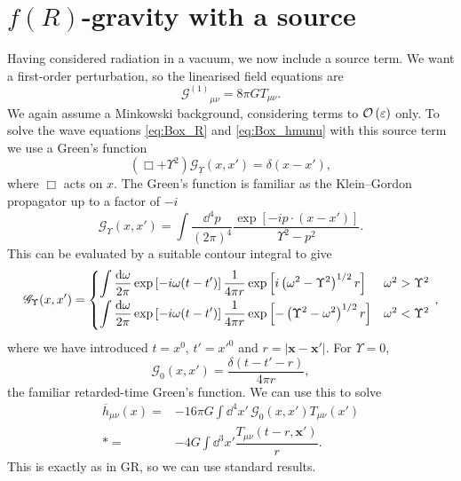 \section{$f(R)$-gravity with a source}\label{sec:Source}

Having considered radiation in a vacuum, we now include a source term. We want a first-order perturbation, so the linearised field equations are
\begin{equation}
{\mathcal{G}^{(1)}}_{\mu\nu} = 8\pi G T_{\mu\nu}.
\end{equation}
We again assume a Minkowski background, considering terms to $\mathcal{O}\left({\varepsilon}\right)$ only. To solve the wave equations \eqref{eq:Box_R} and \eqref{eq:Box_hmunu} with this source term we use a Green's function
\begin{equation}
\left(\Box + \Upsilon^2\right)\mathscr{G}_\Upsilon(x, x') = \delta(x - x'),
\end{equation}
where $\Box$ acts on $x$. The Green's function is familiar as the Klein--Gordon propagator up to a factor of $-i$ \citep[section 2.4]{Peskin1995a}
\begin{equation}
\mathscr{G}_\Upsilon(x, x') = \int \dfrac{\dd^4 p}{(2\pi)^4} \dfrac{\exp\left[-ip\cdot(x-x')\right]}{\Upsilon^2 - p^2}.
\end{equation}
This can be evaluated by a suitable contour integral to give
\begin{equation}
\mathscr{G}_\Upsilon(x, x') =
\begin{cases}
{\displaystyle \int{\dfrac{\dd \omega}{2\pi} \exp\left[-i\omega(t-t')\right]\recip{4\pi r}\exp\left[i\left(\omega^2 - \Upsilon^2\right)^{1/2}r\right]}} & \omega^2 > \Upsilon^2\vspace{0.8mm}\\
{\displaystyle \int{\dfrac{\dd \omega}{2\pi} \exp\left[-i\omega(t-t')\right]\recip{4\pi r}\exp\left[-\left(\Upsilon^2 - \omega^2\right)^{1/2}r\right]}} & \omega^2 < \Upsilon^2\vspace{0.8mm}
\end{cases}\, ,
\label{eq:Green}
\end{equation}
where we have introduced $t = x^0$, $t' = x'^0$ and $r = |\boldsymbol{x} - \boldsymbol{x'}|$. For $\Upsilon = 0$,
\begin{equation}
\mathscr{G}_0(x, x') = \dfrac{\delta(t - t' - r)}{4 \pi r},
\end{equation}
the familiar retarded-time Green's function. We can use this to solve 
\begin{align}
\overline{h}_{\mu\nu}(x) = {} & -16 \pi G \int \dd^4 x'\, \mathscr{G}_0(x, x') T_{\mu\nu}(x') \nonumber \\*
 = {} & -4 G \int \dd^3 x' \dfrac{T_{\mu\nu}(t - r, \boldsymbol{x'})}{r}.
\end{align}
This is exactly as in GR, so we can use standard results.

